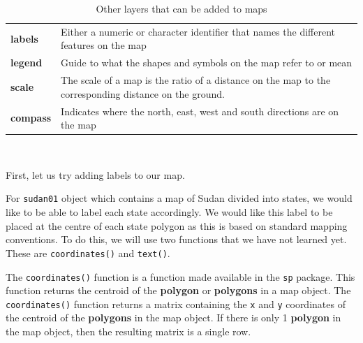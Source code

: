 \documentclass[12pt,a4paper,a4paper]{book}
\theoremstyle{definition}
\theoremstyle{definition}
\theoremstyle{definition}
\theoremstyle{remark}
\begin{document}
\begin{longtable}[]{@{}ll@{}}
\caption{\label{tab:table4} Other layers that can be added to
maps}\tabularnewline
\toprule
\begin{minipage}[t]{0.32\columnwidth}\raggedright
\textbf{labels}\strut
\end{minipage} & \begin{minipage}[t]{0.62\columnwidth}\raggedright
Either a numeric or character identifier that names the different
features on the map\strut
\end{minipage}\tabularnewline
\begin{minipage}[t]{0.32\columnwidth}\raggedright
\textbf{legend}\strut
\end{minipage} & \begin{minipage}[t]{0.62\columnwidth}\raggedright
Guide to what the shapes and symbols on the map refer to or mean\strut
\end{minipage}\tabularnewline
\begin{minipage}[t]{0.32\columnwidth}\raggedright
\textbf{scale}\strut
\end{minipage} & \begin{minipage}[t]{0.62\columnwidth}\raggedright
The scale of a map is the ratio of a distance on the map to the
corresponding distance on the ground.\strut
\end{minipage}\tabularnewline
\begin{minipage}[t]{0.32\columnwidth}\raggedright
\textbf{compass}\strut
\end{minipage} & \begin{minipage}[t]{0.62\columnwidth}\raggedright
Indicates where the north, east, west and south directions are on the
map\strut
\end{minipage}\tabularnewline
\bottomrule
\end{longtable}

~

First, let us try adding labels to our map.

For \texttt{sudan01} object which contains a map of Sudan divided into
states, we would like to be able to label each state accordingly. We
would like this label to be placed at the centre of each state polygon
as this is based on standard mapping conventions. To do this, we will
use two functions that we have not learned yet. These are
\texttt{coordinates()} and \texttt{text()}.

The \texttt{coordinates()} function is a function made available in the
\texttt{sp} package. This function returns the centroid of the
\textbf{polygon} or \textbf{polygons} in a map object. The
\texttt{coordinates()} function returns a matrix containing the
\texttt{x} and \texttt{y} coordinates of the centroid of the
\textbf{polygons} in the map object. If there is only 1 \textbf{polygon}
in the map object, then the resulting matrix is a single row.
\end{document}

